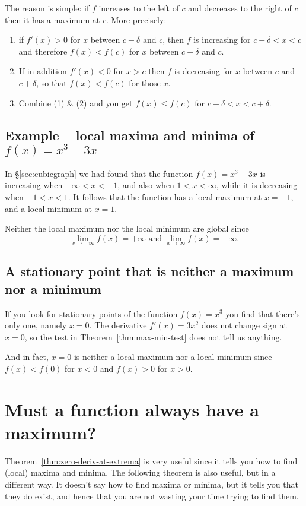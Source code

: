 The reason is simple: if $f$ increases to the left of $c$ and decreases to the
right of $c$ then it has a maximum at $c$.  More precisely:

\begin{enumerate}

\item if $f'(x)>0$ for $x$ between $c-\delta$ and $c$, then $f$ is
  increasing for $c-\delta<x<c$ and therefore $f(x)<f(c)$ for $x$
  between $c-\delta$ and $c$.


\item If in addition $f'(x)<0$ for $x>c$ then $f$ is decreasing for
  $x$ between $c$ and $c+\delta$, so that $f(x)<f(c)$ for those $x$.

\item Combine (1) \& (2) and you get $f(x)\leq f(c)$ for
  $c-\delta<x<c+\delta$.
\end{enumerate}

\subsection{Example -- local maxima and minima of $f(x) = x^3-3x$}
\label{sec:locmaxminofcubic}%
In \S\ref{sec:cubicgraph} we had found that the function $f(x) =
x^3-3x$ is increasing when $-\infty<x<-1$, and also when $1<x<\infty$,
while it is decreasing when $-1<x<1$.  It follows that the function
has a local maximum at $x=-1$, and a local minimum at $x=1$.

Neither the local maximum nor the local minimum are global since
\[
\lim_{x\to-\infty} f(x) = +\infty\text{ and } \lim_{x\to\infty} f(x) = -\infty.
\]


\subsection{A stationary point that is neither a maximum nor a minimum}
If you look for stationary points of the function $f(x) = x^3$ you find that
there's only one, namely $x=0$.  The derivative $f'(x)=3x^2$ does not change
sign at $x=0$, so the test in Theorem~\ref{thm:max-min-test} does not tell us
anything.

And in fact, $x=0$ is neither a local maximum nor a local minimum since
$f(x)<f(0)$ for $x<0$ and $f(x)>0$ for $x>0$.
\marginpar{%
  }






\section{Must a function always have a maximum?}
\label{sec:max-exists}
Theorem~\ref{thm:zero-deriv-at-extrema} is very useful since it tells
you how to find (local) maxima and minima.  The following theorem is
also useful, but in a different way.  It doesn't say how to find
maxima or minima, but it tells you that they do exist, and hence that
you are not wasting your time trying to find them.

